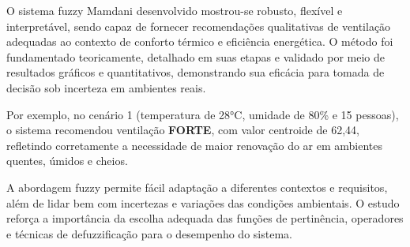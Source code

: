 O sistema fuzzy Mamdani desenvolvido mostrou-se robusto, flexível e interpretável, sendo capaz de fornecer recomendações qualitativas de ventilação adequadas ao contexto de conforto térmico e eficiência energética. O método foi fundamentado teoricamente, detalhado em suas etapas e validado por meio de resultados gráficos e quantitativos, demonstrando sua eficácia para tomada de decisão sob incerteza em ambientes reais.

Por exemplo, no cenário 1 (temperatura de 28°C, umidade de 80\% e 15 pessoas), o sistema recomendou ventilação \textbf{FORTE}, com valor centroide de 62,44, refletindo corretamente a necessidade de maior renovação do ar em ambientes quentes, úmidos e cheios.

A abordagem fuzzy permite fácil adaptação a diferentes contextos e requisitos, além de lidar bem com incertezas e variações das condições ambientais. O estudo reforça a importância da escolha adequada das funções de pertinência, operadores e técnicas de defuzzificação para o desempenho do sistema.


